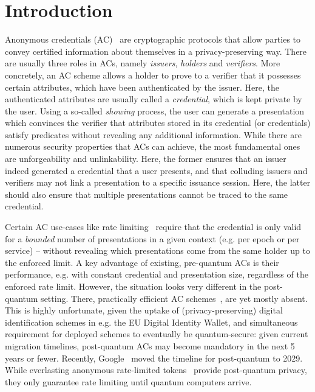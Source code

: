 \section{Introduction}
\label{sec:intro}


Anonymous credentials (AC)~ are cryptographic protocols that allow parties to convey certified information about themselves in a privacy-preserving way. There are usually three roles in ACs, namely \emph{issuers}, \emph{holders} and \emph{verifiers}.  More concretely, an AC scheme allows a holder to prove to a verifier that it possesses certain attributes, which have been authenticated by the issuer. Here, the authenticated attributes are usually called a \emph{credential}, which is kept private by the user. Using a so-called \emph{showing} process, the user can generate a presentation which convinces the verifier that attributes stored in its credential (or credentials) satisfy predicates without revealing any additional information. While there are numerous security properties that ACs can achieve, the most fundamental ones are unforgeability and unlinkability. Here, the former ensures that an issuer indeed generated a credential that a user presents, and that colluding issuers and verifiers may not link a presentation to a specific issuance session.  Here, the latter should also ensure that multiple presentations cannot be traced to the same credential.

Certain AC use-cases like rate limiting~\cite{yun-privacypass-crypto-arc-00,schlesinger-cfrg-act-00} require that the credential is only valid for a \emph{bounded} number of presentations in a given context (e.g. per epoch or per service) -- without revealing which presentations come from the same holder up to the enforced limit. 
A key advantage of existing, pre-quantum ACs is their performance, e.g. with constant credential and presentation size, regardless of the enforced rate limit. However, the situation looks very different in the post-quantum setting. There, practically efficient AC schemes~\cite{CCS:BLNS23,CCS:AGJLRS24,EPRINT:PWFW23}, are yet mostly absent. This is highly unfortunate, given the uptake of (privacy-preserving) digital identification schemes in e.g. the EU Digital Identity Wallet, and simultaneous requirement for deployed schemes to eventually be quantum-secure: given current migration timelines, post-quantum ACs may become mandatory in the next 5 years or fewer. Recently, Google~\cite{google-pq} moved the timeline for post-quantum to 2029. 
While everlasting anonymous rate-limited tokens~\cite{AC:CDLT25} provide post-quantum privacy, they only guarantee rate limiting until quantum computers arrive. 



